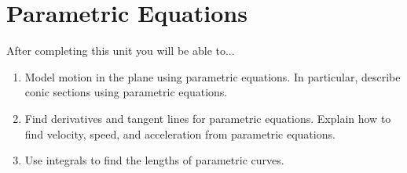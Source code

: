 \documentclass[10pt,]{book}
\theoremstyle{plain}
\theoremstyle{definition}
\theoremstyle{definition}
\theoremstyle{definition}
\theoremstyle{definition}
\theoremstyle{definition}
\numberwithin{equation}{section}
\begin{document}
\chapter[{Parametric Equations}]{Parametric Equations}\label{ch04_parametric}
After completing this unit you will be able to... \leavevmode%
\begin{enumerate}
\item\hypertarget{li-36}{}Model motion in the plane using parametric equations. In particular, describe conic sections using parametric equations.%
\item\hypertarget{li-37}{}Find derivatives and tangent lines for parametric equations. Explain how to find velocity, speed, and acceleration from parametric equations.%
\item\hypertarget{li-38}{}Use integrals to find the lengths of parametric curves.%
\end{enumerate}
%
\typeout{************************************************}
\typeout{************************************************}
\end{document}
